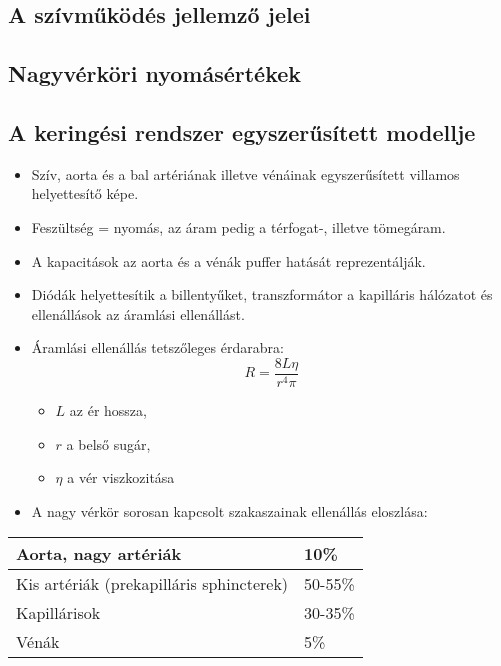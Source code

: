 \subsection{A szívműködés jellemző jelei}

\subsection{Nagyvérköri nyomásértékek}

\subsection{A keringési rendszer egyszerűsített modellje}
\begin{itemize}
    \item Szív, aorta és a bal artériának illetve vénáinak egyszerűsített villamos helyettesítő képe.
    \item Feszültség = nyomás, az áram pedig a térfogat-, illetve tömegáram.
    \item A kapacitások az aorta és a vénák puffer hatását reprezentálják.
    \item Diódák helyettesítik a billentyűket, transzformátor a kapilláris hálózatot és ellenállások az áramlási ellenállást.
\end{itemize}

\begin{itemize}
    \item Áramlási ellenállás tetszőleges érdarabra: \\
    \[ R = \frac{8L\eta}{r^4\pi} \]
    \begin{itemize}
        \item $L$ az ér hossza,
        \item $r$ a belső sugár,
        \item $\eta$ a vér viszkozitása
    \end{itemize}
    \item A nagy vérkör sorosan kapcsolt szakaszainak ellenállás eloszlása:
\end{itemize}
\begin{table}[h!]
    \centering
    \footnotesize
    \begin{tabularx}{\textwidth}{|X|X|}
    \hline
    Aorta, nagy artériák & 10\% \\ \hline
    Kis artériák (prekapilláris sphincterek) & 50-55\% \\ \hline
    Kapillárisok & 30-35\% \\ \hline
    Vénák & 5\% \\ \hline
    \end{tabularx}
    \label{your_label_here}
\end{table}

